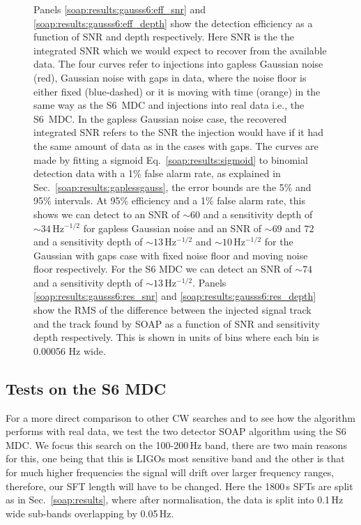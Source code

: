 \begin{figure}[p]
\caption[Sensitivity curves for SOAP search when run on S6 and Gaussian noise.]{Panels \ref{soap:results:gausss6:eff_snr} and \ref{soap:results:gausss6:eff_depth} show the detection efficiency as a function of \gls{SNR} and depth respectively. Here \gls{SNR} is the the integrated \gls{SNR} which we would expect to recover from the available data. The four curves refer to injections into gapless Gaussian noise (red), Gaussian noise with gaps in data, where the noise floor is either fixed (blue-dashed) or it is moving with time (orange) in the same way as the S6~\gls{MDC} and injections into real data i.e., the S6~\gls{MDC}. In the gapless Gaussian noise case, the recovered integrated \gls{SNR} refers to the \gls{SNR} the injection would have if it had the same amount of data as in the cases with gaps.
The curves are made by fitting a sigmoid Eq.~\ref{soap:results:sigmoid} to binomial detection data with a 1\% false alarm rate, as explained in Sec.~\ref{soap:results:gaplessgauss}, the error bounds are the 5\% and 95\% intervals.
At 95\% efficiency and a 1\% false alarm rate, this shows we can detect to an \gls{SNR}  of $\sim 60$ and a sensitivity depth of $\sim 34$\,Hz$^{-1/2}$ for gapless Gaussian noise and an \gls{SNR}  of $\sim 69$ and $72$ and a sensitivity depth of $\sim 13$\,Hz$^{-1/2}$ and $\sim 10$\,Hz$^{-1/2}$ for the Gaussian with gaps case with fixed noise floor and moving noise floor respectively. For the S6 \gls{MDC} we can detect an \gls{SNR} of $\sim 74$ and a sensitivity depth of $\sim 13$\,Hz$^{-1/2}$. 
 Panels \ref{soap:results:gausss6:res_snr} and \ref{soap:results:gausss6:res_depth} show the \gls{RMS} of the difference between the injected signal track and the track found by SOAP as a function of \gls{SNR} and sensitivity depth respectively. This is shown in units of bins where each bin is 0.00056 Hz wide.\label{soap:results:gausss6:plots} }
\end{figure}


\subsection{\label{soap:results:s6}Tests on the S6 MDC}
%
%
For a more direct comparison to other \gls{CW} searches and to see how the
algorithm performs with real data, we test the two detector SOAP algorithm using the S6 \gls{MDC}. We focus this search on the 100-200\,Hz band, there are two main reasons for this, one being that this is \glspl{LIGO} most sensitive band and the other is that for much higher frequencies the signal will drift over larger frequency ranges, therefore, our \gls{SFT} length will have to be changed.
Here the 1800\,s \glspl{SFT} are split as in Sec.~\ref{soap:results}, where after normalisation, the data is split into 0.1\,Hz wide sub-bands overlapping by 0.05\,Hz.

